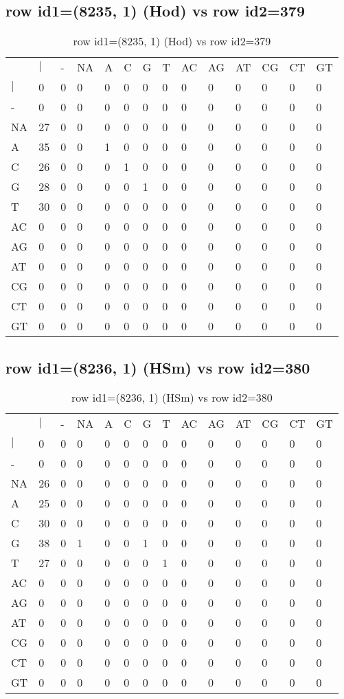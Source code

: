 \subsection{row id1=(8235, 1) (Hod) vs row id2=379}
\begin{center}
\begin{longtable}{|l|l|l|l|l|l|l|l|l|l|l|l|l|l|}
\caption{row id1=(8235, 1) (Hod) vs row id2=379} \label{table_dm166}\\
\hline
\\
\hline
&$|$&-&NA&A&C&G&T&AC&AG&AT&CG&CT&GT\\
$|$&0&0&0&0&0&0&0&0&0&0&0&0&0\\
-&0&0&0&0&0&0&0&0&0&0&0&0&0\\
NA&27&0&0&0&0&0&0&0&0&0&0&0&0\\
A&35&0&0&1&0&0&0&0&0&0&0&0&0\\
C&26&0&0&0&1&0&0&0&0&0&0&0&0\\
G&28&0&0&0&0&1&0&0&0&0&0&0&0\\
T&30&0&0&0&0&0&0&0&0&0&0&0&0\\
AC&0&0&0&0&0&0&0&0&0&0&0&0&0\\
AG&0&0&0&0&0&0&0&0&0&0&0&0&0\\
AT&0&0&0&0&0&0&0&0&0&0&0&0&0\\
CG&0&0&0&0&0&0&0&0&0&0&0&0&0\\
CT&0&0&0&0&0&0&0&0&0&0&0&0&0\\
GT&0&0&0&0&0&0&0&0&0&0&0&0&0\\
\hline
\end{longtable}
\end{center}

\subsection{row id1=(8236, 1) (HSm) vs row id2=380}
\begin{center}
\begin{longtable}{|l|l|l|l|l|l|l|l|l|l|l|l|l|l|}
\caption{row id1=(8236, 1) (HSm) vs row id2=380} \label{table_dm168}\\
\hline
\\
\hline
&$|$&-&NA&A&C&G&T&AC&AG&AT&CG&CT&GT\\
$|$&0&0&0&0&0&0&0&0&0&0&0&0&0\\
-&0&0&0&0&0&0&0&0&0&0&0&0&0\\
NA&26&0&0&0&0&0&0&0&0&0&0&0&0\\
A&25&0&0&0&0&0&0&0&0&0&0&0&0\\
C&30&0&0&0&0&0&0&0&0&0&0&0&0\\
G&38&0&1&0&0&1&0&0&0&0&0&0&0\\
T&27&0&0&0&0&0&1&0&0&0&0&0&0\\
AC&0&0&0&0&0&0&0&0&0&0&0&0&0\\
AG&0&0&0&0&0&0&0&0&0&0&0&0&0\\
AT&0&0&0&0&0&0&0&0&0&0&0&0&0\\
CG&0&0&0&0&0&0&0&0&0&0&0&0&0\\
CT&0&0&0&0&0&0&0&0&0&0&0&0&0\\
GT&0&0&0&0&0&0&0&0&0&0&0&0&0\\
\hline
\end{longtable}
\end{center}

